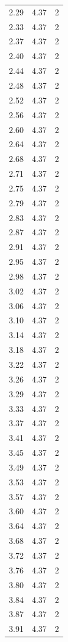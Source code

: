 \begin{longtable}{lrr}
  2.29 & 4.37 & 2 \\
  2.33 & 4.37 & 2 \\
  2.37 & 4.37 & 2 \\
  2.40 & 4.37 & 2 \\
  2.44 & 4.37 & 2 \\
  2.48 & 4.37 & 2 \\
  2.52 & 4.37 & 2 \\
  2.56 & 4.37 & 2 \\
  2.60 & 4.37 & 2 \\
  2.64 & 4.37 & 2 \\
  2.68 & 4.37 & 2 \\
  2.71 & 4.37 & 2 \\
  2.75 & 4.37 & 2 \\
  2.79 & 4.37 & 2 \\
  2.83 & 4.37 & 2 \\
  2.87 & 4.37 & 2 \\
  2.91 & 4.37 & 2 \\
  2.95 & 4.37 & 2 \\
  2.98 & 4.37 & 2 \\
  3.02 & 4.37 & 2 \\
  3.06 & 4.37 & 2 \\
  3.10 & 4.37 & 2 \\
  3.14 & 4.37 & 2 \\
  3.18 & 4.37 & 2 \\
  3.22 & 4.37 & 2 \\
  3.26 & 4.37 & 2 \\
  3.29 & 4.37 & 2 \\
  3.33 & 4.37 & 2 \\
  3.37 & 4.37 & 2 \\
  3.41 & 4.37 & 2 \\
  3.45 & 4.37 & 2 \\
  3.49 & 4.37 & 2 \\
  3.53 & 4.37 & 2 \\
  3.57 & 4.37 & 2 \\
  3.60 & 4.37 & 2 \\
  3.64 & 4.37 & 2 \\
  3.68 & 4.37 & 2 \\
  3.72 & 4.37 & 2 \\
  3.76 & 4.37 & 2 \\
  3.80 & 4.37 & 2 \\
  3.84 & 4.37 & 2 \\
  3.87 & 4.37 & 2 \\
  3.91 & 4.37 & 2 \\

\end{longtable}
